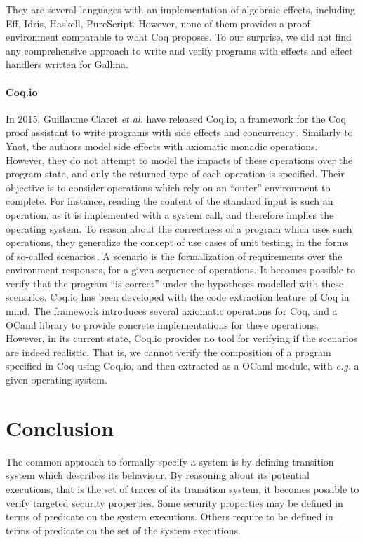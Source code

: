 They are several languages with an implementation of algebraic effects, including
Eff, Idris, Haskell, PureScript.
%
However, none of them provides a proof environment comparable to what Coq
proposes.
%
To our surprise, we did not find any comprehensive approach to write and verify
programs with effects and effect handlers written for {\sc Gallina}.

\paragraph{Coq.io}
%
In 2015, Guillaume Claret \emph{et al.} have released Coq.io, a framework for
the Coq proof assistant to write programs with side effects and
concurrency\,\cite{claret2015coqiowww}.
%
Similarly to Ynot, the authors model side effects with axiomatic monadic
operations.
%
However, they do not attempt to model the impacts of these operations over the
program state, and only the returned type of each operation is specified.
%
Their objective is to consider operations which rely on an ``outer'' environment
to complete.
%
For instance, reading the content of the standard input is such an operation, as
it is implemented with a system call, and therefore implies the operating
system.
%
To reason about the correctness of a program which uses such operations, they
generalize the concept of use cases of unit testing, in the forms of so-called
scenarios\,\cite{claret2015coqio}.
%
A scenario is the formalization of requirements over the environment responses,
for a given sequence of operations.
%
It becomes possible to verify that the program ``is correct'' under the
hypotheses modelled with these scenarios.
%
Coq.io has been developed with the code extraction feature of Coq in mind.
%
The framework introduces several axiomatic operations for Coq, and a OCaml
library to provide concrete implementations for these operations.
%
However, in its current state, Coq.io provides no tool for verifying if the
scenarios are indeed realistic.
%
That is, we cannot verify the composition of a program specified in Coq using
Coq.io, and then extracted as a OCaml module, with \emph{e.g.} a given operating
system.

\section{Conclusion} %

The common approach to formally specify a system is by defining transition system
which describes its behaviour.
%
By reasoning about its potential executions, that is the set of traces of its
transition system, it becomes possible to verify targeted security properties.
%
Some security properties may be defined in terms of predicate on the system
executions.
%
Others require to be defined in terms of predicate on the set of the system
executions.

